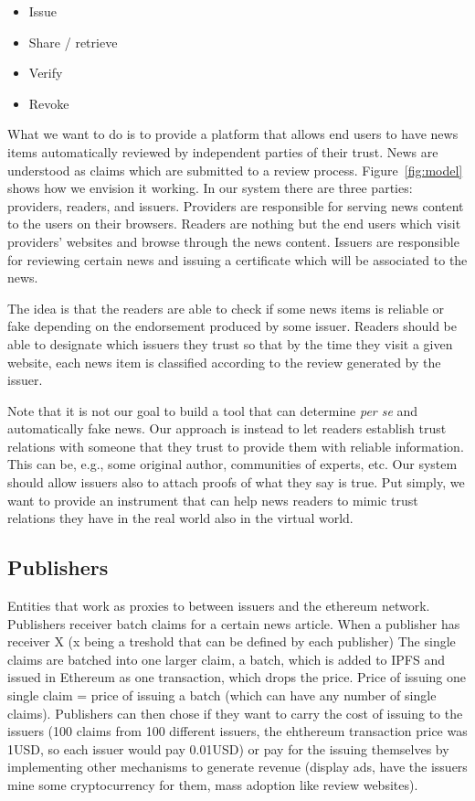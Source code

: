 \begin{itemize}
    \item Issue
    \item Share / retrieve
    \item Verify
    \item Revoke
\end{itemize}

What we want to do is to provide a platform that allows end users to have news items automatically reviewed by independent parties of their trust. News are understood as claims which are submitted to a review process. Figure~\ref{fig:model} shows how we envision it working. In our system there are three parties: providers, readers, and issuers. Providers are responsible for serving news content to the users on their browsers. Readers are nothing but the end users which visit providers' websites and browse through the news content. Issuers are responsible for reviewing certain news and issuing a certificate which will be associated to the news.

The idea is that the readers are able to check if some news items is reliable or fake depending on the endorsement produced by some issuer. Readers should be able to designate which issuers they trust so that by the time they visit a given website, each news item is classified according to the review generated by the issuer.

Note that it is not our goal to build a tool that can determine {\em per se} and automatically fake news. Our approach is instead to let readers establish trust relations with someone that they trust to provide them with reliable information. This can be, e.g., some original author, communities of experts, etc. Our system should allow issuers also to attach proofs of what they say is true. Put simply, we want to provide an instrument that can help news readers to mimic trust relations they have in the real world also in the virtual world.


\subsection{Publishers}

Entities that work as proxies to between issuers and the ethereum network.
Publishers receiver batch claims for a certain news article. When a publisher has receiver X (x being a treshold that can be defined by each publisher)
The single claims are batched into one larger claim, a batch, which is added to IPFS and issued in Ethereum as one transaction, which drops the price. Price of issuing one single claim = price of issuing a batch (which can have any number of single claims).
Publishers can then chose if they want to carry the cost of issuing to the issuers (100 claims from 100 different issuers, the ehthereum transaction price was 1USD, so each issuer would pay 0.01USD) or pay for the issuing themselves by implementing other mechanisms to generate revenue (display ads, have the issuers mine some cryptocurrency for them, mass adoption like review websites).

